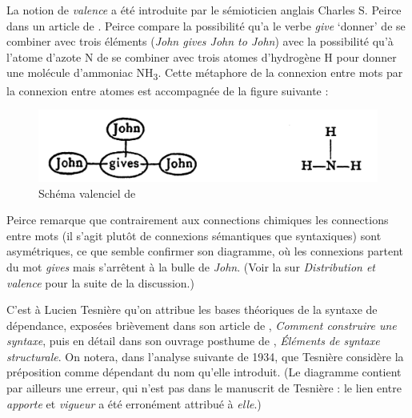 {    La notion de \textit{valence} a été introduite par le sémioticien anglais Charles S. Peirce dans un article de \citeyear{peirce1897logic}. Peirce compare la possibilité qu’a le verbe \textit{give} ‘donner’ de se combiner avec trois éléments (\textit{John gives John to John}) avec la possibilité qu’à l’atome d’azote N de se combiner avec trois atomes d’hydrogène H pour donner une molécule d’ammoniac NH\textsubscript{3}. Cette métaphore de la connexion entre mots par la connexion entre atomes est accompagnée de la figure suivante :

    \begin{figure}[H]
    \caption{Schéma valenciel de \citet{peirce1897logic}}
    \includegraphics[width=\textwidth]{figures/vol1syntaxe2-img016.png}
    \end{figure}

    Peirce remarque que contrairement aux connections chimiques les connections entre mots (il s’agit plutôt de connexions sémantiques que syntaxiques) sont asymétriques, ce que semble confirmer son diagramme, où les connexions partent du mot \textit{gives} mais s’arrêtent à la bulle de \textit{John}. (Voir la  sur \textit{Distribution et valence} pour la suite de la discussion.)

    C’est à Lucien Tesnière qu’on attribue les bases théoriques de la syntaxe de dépendance, exposées brièvement dans son article de \citeyear{tesniere1934comment}, \textit{Comment construire une syntaxe}, puis en détail dans son ouvrage posthume de \citeyear{tesniere1959elements}, \textit{Éléments de syntaxe structurale}. On notera, dans l’analyse suivante de 1934, que Tesnière considère la préposition comme dépendant du nom qu’elle introduit. (Le diagramme contient par ailleurs une erreur, qui n’est pas dans le manuscrit de Tesnière : le lien entre \textit{apporte} et \textit{vigueur} a été erronément attribué à \textit{elle}.)

}
